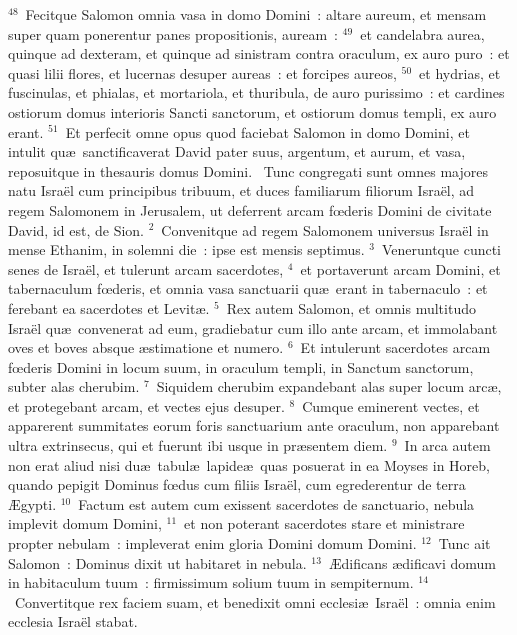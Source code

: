 ${}^{48}$~Fecitque Salomon omnia vasa in domo Domini~: altare aureum, et mensam super quam ponerentur panes propositionis, auream~:
${}^{49}$~et candelabra aurea, quinque ad dexteram, et quinque ad sinistram contra oraculum, ex auro puro~: et quasi lilii flores, et lucernas desuper aureas~: et forcipes aureos,
${}^{50}$~et hydrias, et fuscinulas, et phialas, et mortariola, et thuribula, de auro purissimo~: et cardines ostiorum domus interioris Sancti sanctorum, et ostiorum domus templi, ex auro erant.
${}^{51}$~Et perfecit omne opus quod faciebat Salomon in domo Domini, et intulit qu\ae\ sanctificaverat David pater suus, argentum, et aurum, et vasa, reposuitque in thesauris domus Domini.
~\lettrine[lines=10,image=true,loversize=0.05,lraise=-0.03]{T}{}unc congregati sunt omnes majores natu Isra\"el cum principibus tribuum, et duces familiarum filiorum Isra\"el, ad regem Salomonem in Jerusalem, ut deferrent arcam fœderis Domini de civitate David, id est, de Sion.
${}^{2}$~Convenitque ad regem Salomonem universus Isra\"el in mense Ethanim, in solemni die~: ipse est mensis septimus.
${}^{3}$~Veneruntque cuncti senes de Isra\"el, et tulerunt arcam sacerdotes,
${}^{4}$~et portaverunt arcam Domini, et tabernaculum fœderis, et omnia vasa sanctuarii qu\ae\ erant in tabernaculo~: et ferebant ea sacerdotes et Levit\ae .
${}^{5}$~Rex autem Salomon, et omnis multitudo Isra\"el qu\ae\ convenerat ad eum, gradiebatur cum illo ante arcam, et immolabant oves et boves absque \ae stimatione et numero.
${}^{6}$~Et intulerunt sacerdotes arcam fœderis Domini in locum suum, in oraculum templi, in Sanctum sanctorum, subter alas cherubim.
${}^{7}$~Siquidem cherubim expandebant alas super locum arc\ae , et protegebant arcam, et vectes ejus desuper.
${}^{8}$~Cumque eminerent vectes, et apparerent summitates eorum foris sanctuarium ante oraculum, non apparebant ultra extrinsecus, qui et fuerunt ibi usque in pr\ae sentem diem.
${}^{9}$~In arca autem non erat aliud nisi du\ae\ tabul\ae\ lapide\ae\ quas posuerat in ea Moyses in Horeb, quando pepigit Dominus fœdus cum filiis Isra\"el, cum egrederentur de terra \AE gypti.
${}^{10}$~Factum est autem cum exissent sacerdotes de sanctuario, nebula implevit domum Domini,
${}^{11}$~et non poterant sacerdotes stare et ministrare propter nebulam~: impleverat enim gloria Domini domum Domini.
${}^{12}$~Tunc ait Salomon~: Dominus dixit ut habitaret in nebula.
${}^{13}$~\AE dificans \ae dificavi domum in habitaculum tuum~: firmissimum solium tuum in sempiternum.
${}^{14}$~Convertitque rex faciem suam, et benedixit omni ecclesi\ae\ Isra\"el~: omnia enim ecclesia Isra\"el stabat.
